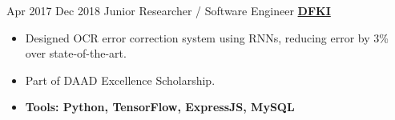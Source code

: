 \begin{twenty}
    \twentyitem
        {Apr 2017}
        {Dec 2018}
        {Junior Researcher / Software Engineer}
        {\large\textbf{\href{http://www.dfki.de/}{DFKI}}}
        {
            \begin{itemize}
                \item Designed OCR error correction system using RNNs, reducing error by 3\% over state-of-the-art.
                \item Part of DAAD Excellence Scholarship.
                \item \textbf{Tools: Python, TensorFlow, ExpressJS, MySQL}
            \end{itemize}
        }
        {\\}
\end{twenty}
